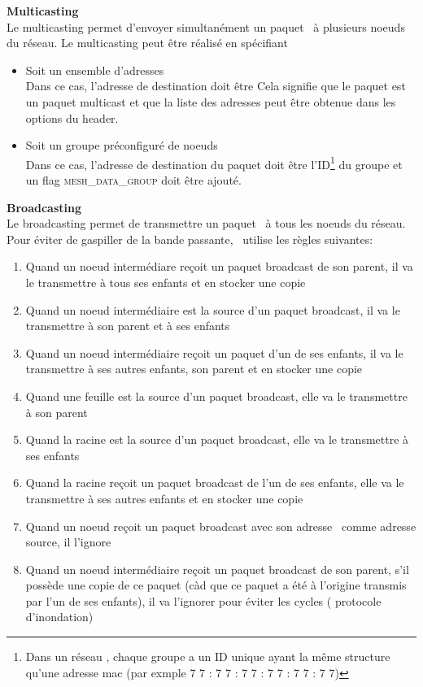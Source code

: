 \vspace{0.5cm}
\textbf{Multicasting}\\
    Le multicasting permet d'envoyer simultanément un paquet \espmesh\ à plusieurs noeuds du réseau. Le multicasting
    peut être réalisé en spécifiant
    \begin{itemize}
        \item Soit un ensemble d'adresses \mac\\
            Dans ce cas, l'adresse de destination doit être
            {\selectfont {}}
            Cela signifie que le paquet est un paquet multicast et que la liste des adresses peut être obtenue dans les options du header.
        \item Soit un groupe préconfiguré de noeuds\\
            Dans ce cas, l'adresse de destination du paquet doit être l'ID\footnote{Dans un réseau \espmesh, chaque groupe a un ID unique
            ayant la même structure qu'une adresse mac (par exmple {\small 7 7 : 7 7 : 7 7 : 7 7 : 7 7 : 7 7})}
            du groupe et un flag \textsc{mesh\_data\_group} doit être ajouté. %
    \end{itemize}

\vspace{0.5cm}
\textbf{Broadcasting}\\
    Le broadcasting permet de transmettre un paquet \espmesh\ à tous les noeuds du réseau. Pour éviter de gaspiller de
    la bande passante, \espmesh\ utilise les règles suivantes:
    \begin{enumerate}
        \item Quand un noeud intermédiare reçoit un paquet broadcast de son parent, il va le transmettre à tous ses enfants
            et en stocker une copie
        \item Quand un noeud intermédiaire est la source d'un paquet broadcast, il va le transmettre à son parent et à ses enfants
        \item Quand un noeud intermédiaire reçoit un paquet d'un de ses enfants, il va le transmettre à ses autres enfants, son parent
            et en stocker une copie
        \item Quand une feuille est la source d'un paquet broadcast, elle va le transmettre à son parent
        \item Quand la racine est la source d'un paquet broadcast, elle va le transmettre à ses enfants
        \item Quand la racine reçoit un paquet broadcast de l'un de ses enfants, elle va le transmettre à ses autres enfants et en stocker une copie
        \item Quand un noeud reçoit un paquet broadcast avec son adresse \mac\ comme adresse source, il l'ignore
        \item Quand un noeud intermédiaire reçoit un paquet broadcast de son parent, s'il possède une copie de ce paquet (càd que ce paquet a été à l'origine transmis par l'un de ses enfants), il va l'ignorer
            pour éviter les cycles ( protocole d'inondation)
    \end{enumerate}